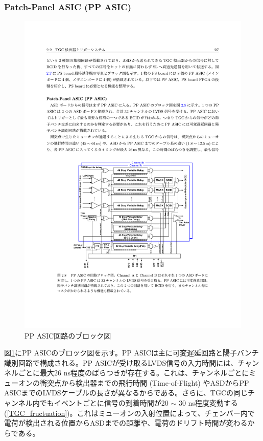     \subsubsection*{Patch-Panel ASIC (PP ASIC)}


    \begin{figure} 
    \centering
    \includegraphics[width=16cm]{fig/Intro/TGC_PPASIC.pdf}
    \caption[PP ASIC回路のブロック図]{PP ASIC回路のブロック図\cite{PPASIC}}
    \label{TGC_PPASIC}
    \end{figure}

    図\ref{TGC_PPASIC}にPP ASICのブロック図を示す。PP ASICは主に可変遅延回路と陽子バンチ識別回路で構成される。PP ASICが受け取るLVDS信号の入力時間には、チャンネルごとに最大26 ns程度のばらつきが存在する。これは、チャンネルごとにミューオンの衝突点から検出器までの飛行時間  (Time-of-Flight) やASDからPP ASICまでのLVDSケーブルの長さが異なるからである。さらに、TGCの同じチャンネル内でもイベントごとに信号の到着時間が20 $\sim$ 30 ns程度変動する (\ref{TGC_fructuation})。これはミューオンの入射位置によって、チェンバー内で電荷が検出される位置からASDまでの距離や、電荷のドリフト時間が変わるからである。

